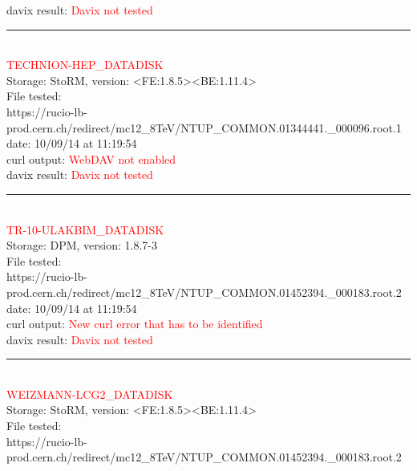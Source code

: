 davix result:  \textcolor{red}{Davix not tested}\\

\rule{\textwidth}{1pt}\\

\textcolor{red}{\normalsize{TECHNION-HEP\_DATADISK}}\\

Storage: StoRM, version: <FE:1.8.5><BE:1.11.4>\\

File tested:\\
\footnotesize{https://rucio-lb-prod.cern.ch/redirect/mc12\_8TeV/NTUP\_COMMON.01344441.\_000096.root.1}\\

date: 10/09/14 at 11:19:54\\

curl output:  \textcolor{red}{WebDAV not enabled}\\

davix result:  \textcolor{red}{Davix not tested}\\

\rule{\textwidth}{1pt}\\

\textcolor{red}{\normalsize{TR-10-ULAKBIM\_DATADISK}}\\

Storage: DPM, version: 1.8.7-3\\

File tested:\\
\footnotesize{https://rucio-lb-prod.cern.ch/redirect/mc12\_8TeV/NTUP\_COMMON.01452394.\_000183.root.2}\\

date: 10/09/14 at 11:19:54\\

curl output:  \textcolor{red}{New curl error that has to be identified}\\

davix result:  \textcolor{red}{Davix not tested}\\

\rule{\textwidth}{1pt}\\

\textcolor{red}{\normalsize{WEIZMANN-LCG2\_DATADISK}}\\

Storage: StoRM, version: <FE:1.8.5><BE:1.11.4>\\

File tested:\\
\footnotesize{https://rucio-lb-prod.cern.ch/redirect/mc12\_8TeV/NTUP\_COMMON.01452394.\_000183.root.2}\\

